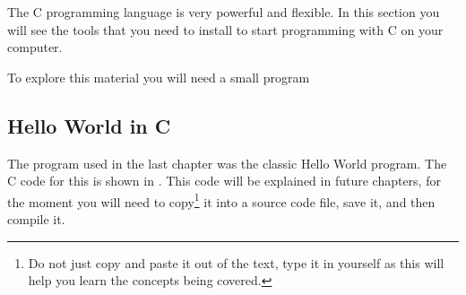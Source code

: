 The C programming language is very powerful and flexible. In this section you will see the tools that you need to install to start programming with C on your computer.

To explore this material you will need a small program

\subsection{Hello World in C} %
\label{sub:hello_world_in_c}

The program used in the last chapter was the classic Hello World program. The C code for this is shown in . This code will be explained in future chapters, for the moment you will need to copy\footnote{Do not just copy and paste it out of the text, type it in yourself as this will help you learn the concepts being covered.} it into a source code file, save it, and then compile it.

\csection
{
}


